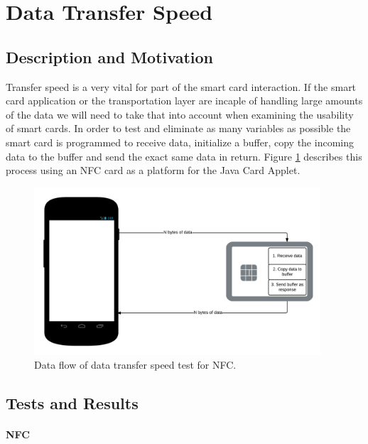 \section{Data Transfer Speed}
\subsection{Description and Motivation}
Transfer speed is a very vital for part of the smart card interaction. If the smart card application or the transportation layer are incaple of handling large amounts of the data we will need to take that into account when examining the usability of smart cards. In order to test and eliminate as many variables as possible the smart card is programmed to receive data, initialize a buffer, copy the incoming data to the buffer and send the exact same data in return. Figure \ref{fig:nfcDataflowTest} describes this process using an NFC card as a platform for the Java Card Applet.

\begin{figure}[h!]
  \caption{Data flow of data transfer speed test for NFC.}
  \label{fig:nfcDataflowTest}
  \centering
    \includegraphics[width=0.95\textwidth]{images/NFCTransferTest.png}
\end{figure}

\subsection{Tests and Results}
\paragraph{NFC}\mbox{}\\



